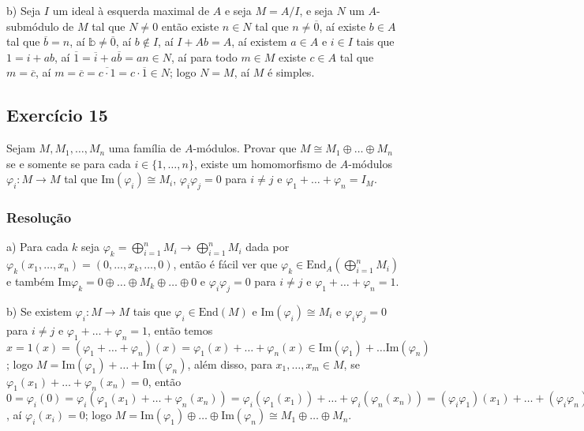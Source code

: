 \documentclass[10pt,a4paper]{article}
\begin{document}
\medskip
\noindent
b) Seja $I$ um ideal à esquerda maximal de $A$ e seja $M=A/I$, e seja $N$ um $A$-submódulo de $M$ tal que $N\neq 0$ então existe $n\in N$ tal que $n\neq\overline{0}$, aí existe $b\in A$ tal que $\overline{b}=n$, aí $\mathbb{b}\neq\overline{0}$, aí $b\notin I$, aí $I+Ab=A$, aí existem $a\in A$ e $i\in I$ tais que $1=i+ab$, aí $\overline{1}=\overline{i}+a\overline{b}=an\in N$, aí para todo $m\in M$ existe $c\in A$ tal que $m=\overline{c}$, aí $m=\overline{c}=\overline{c\cdot1}=c\cdot\overline{1}\in N$; logo $N=M$, aí $M$ é simples.

\subsection*{Exercício 15}

Sejam $M,M_1,\dots,M_n$ uma família de $A$-módulos. Provar que $M\cong M_1\oplus\dots\oplus M_n$ se e somente se para cada $i\in\{1,\dots,n\}$, existe um homomorfismo de $A$-módulos $\varphi_i:M\rightarrow M$ tal que $\mathrm{Im}(\varphi_i)\cong M_i$, $\varphi_i\varphi_j=0$ para $i\neq j$ e $\varphi_1+\dots+\varphi_n=I_M$.

\subsubsection*{Resolução}

a) Para cada $k$ seja $\varphi_k=\bigoplus_{i=1}^n M_i\rightarrow\bigoplus_{i=1}^n M_i$ dada por $\varphi_k(x_1,\dots,x_n)=(0,\dots,x_k,\dots,0)$, então é fácil ver que $\varphi_k\in\mathrm{End}_A(\bigoplus_{i=1}^n M_i)$ e também $\mathrm{Im}\varphi_k=0\oplus\dots\oplus M_k\oplus\dots\oplus 0$ e $\varphi_i\varphi_j=0$ para $i\neq j$ e $\varphi_1+\dots+\varphi_n=1$.

\medskip
\noindent
b) Se existem $\varphi_i:M\rightarrow M$ tais que $\varphi_i\in\mathrm{End}(M)$ e $\mathrm{Im}(\varphi_i)\cong M_i$ e $\varphi_i\varphi_j=0$ para $i\neq j$ e $\varphi_1+\dots+\varphi_n=1$, então temos $x=1(x)=(\varphi_1+\dots+\varphi_n)(x)=\varphi_1(x)+\dots+\varphi_n(x)\in\mathrm{Im}(\varphi_1)+\dots\mathrm{Im}(\varphi_n)$; logo $M=\mathrm{Im}(\varphi_1)+\dots+\mathrm{Im}(\varphi_n)$, além disso, para $x_1,\dots,x_m\in M$, se $\varphi_1(x_1)+\dots+\varphi_n(x_n)=0$, então $0=\varphi_i(0)=\varphi_i(\varphi_1(x_1)+\dots+\varphi_n(x_n))=\varphi_i(\varphi_1(x_1))+\dots+\varphi_i(\varphi_n(x_n))=(\varphi_i\varphi_1)(x_1)+\dots+(\varphi_i\varphi_n)(x_n)=(\varphi_i\varphi_i)(x_i)=(\varphi_i\varphi_1+\dots+\varphi_i\varphi_n)(x_i)=(\varphi_i(\varphi_1+\dots+\varphi_n))(x_i)=(\varphi_i1)(x_i)=\varphi_i(x_i)$, aí $\varphi_i(x_i)=0$; logo $M=\mathrm{Im}(\varphi_1)\oplus\dots\oplus\mathrm{Im}(\varphi_n)\cong M_1\oplus\dots\oplus M_n$.
\end{document}
